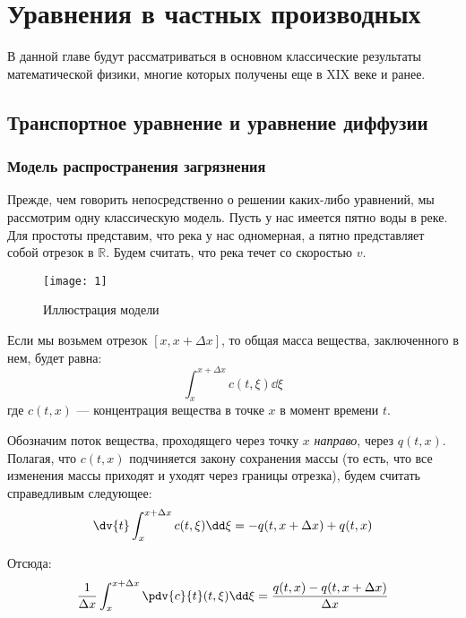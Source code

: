 \clearpage

\section{Уравнения в частных производных}

В данной главе будут рассматриваться в основном классические результаты математической физики, многие которых получены еще в XIX веке и ранее.

\subsection{Транспортное уравнение и уравнение диффузии}

\subsubsection{Модель распространения загрязнения}

Прежде, чем говорить непосредственно о решении каких-либо уравнений, мы рассмотрим одну классическую модель. Пусть у нас имеется пятно воды в реке. Для простоты представим, что река у нас одномерная, а пятно представляет собой отрезок в $\mathbb{R}$. Будем считать, что река течет со скоростью $v$.

\begin{figure}[ht]
  \centering
  \texttt{[image: 1]}
  \caption{Иллюстрация модели}
\end{figure}

Если мы возьмем отрезок $[x, x + \Delta x]$, то общая масса вещества, заключенного в нем, будет равна:
%
\begin{equation*}
  \int_x^{x + \Delta x} c(t, \xi) \dd \xi
\end{equation*}
где $c(t, x)$ --- концентрация вещества в точке $x$ в момент времени $t$.

Обозначим поток вещества, проходящего через точку $x$ \emph{направо}, через $q(t, x)$. Полагая, что $c(t, x)$ подчиняется закону сохранения массы (то есть, что все изменения массы приходят и уходят через границы отрезка), будем считать справедливым следующее:
%
\begin{equation*}
  \dv{t} \int_x^{x + \Delta x} c(t, \xi) \dd \xi = -q(t, x + \Delta x) + q(t, x)
\end{equation*}

Отсюда:
%
\begin{equation*}
  \frac{1}{\Delta x} \int_{x}^{x + \Delta x} \pdv{c}{t} (t, \xi) \dd \xi = \frac{q(t, x) - q(t, x + \Delta x)}{\Delta x}
\end{equation*}

